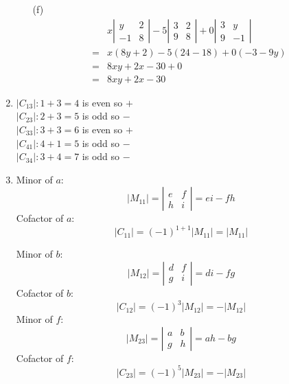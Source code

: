 \documentclass{./../../Latex/homework}
\begin{document}
\begin{enumerate}
\begin{enumerate}
\item[(f)] $$
\begin{aligned}
& x\left|\begin{array}{cc}
y & 2 \\
-1 & 8
\end{array}\right|-5\left|\begin{array}{cc}
3 & 2 \\
9 & 8
\end{array}\right|+0\left|\begin{array}{rr}
3 & y \\
9 & -1
\end{array}\right| \\
=& x(8 y+2)-5(24-18)+0(-3-9 y) \\
=& 8 x y+2 x-30+0 \\
=& 8 x y+2 x-30
\end{aligned}
$$
\end{enumerate}

  \item \( \left|C_{13}\right|: 1+3=4 \) is even so \( + \)\\
\( \left|C_{23}\right|: 2+3=5 \) is odd so \(- \)\\
\( \left|C_{33}\right|: 3+3=6 \) is even so \( + \)\\
\( \left|C_{41}\right|: 4+1=5 \) is odd so \( - \)\\
\( \left|C_{34}\right|: 3+4=7 \) is odd so \( - \) \\


\item 
Minor of \(a\):
$$ \left|M_{11}\right|=\left|\begin{array}{cc}e & f \\ h & i\end{array}\right|=e i-f h $$
Cofactor of \(a\): $$
\left|C_{11}\right|=(-1)^{1+1}\left|M_{11}\right|=\left|M_{11}\right|
$$

Minor of \(b\):
$$ \left|M_{12}\right|=\left|\begin{array}{ll}d & f \\ g & i\end{array}\right|=d i-f g $$
Cofactor of \(b\):
$$\left|C_{12}\right|=(-1)^{3}\left|M_{12}\right|=-\left|M_{12}\right| $$
Minor of \(f\):
$$ \left|M_{23}\right|=\left|\begin{array}{ll}a & b \\ g & h\end{array}\right|=a h-b g $$
Cofactor of \(f\):
$$\left|C_{23}\right|=(-1)^{5}\left|M_{23}\right|=-\left|M_{23}\right| $$ \\


\end{enumerate}
\end{document}
